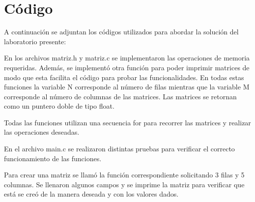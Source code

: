 \documentclass[
  letterpaper, 
  maincolor=black,
  sectioncolor=black!90,
  subsectioncolor=black!70,
  itemtextcolor=black!40,
]{fortysecondscv}
\begin{document}
\makefrontsidebar

\cvsubsection{\Huge }
\cvsubsection{\Huge }




\newpage

\section{Código}

A continuación se adjuntan los códigos utilizados para abordar la solución del laboratorio presente: 





En los archivos matriz.h y matriz.c se implementaron las operaciones de memoria requeridas. Además, se implementó otra función para poder imprimir matrices de modo que esta facilita el código para probar las funcionalidades. En todas estas funciones la variable N corresponde al número de filas mientras que la variable M corresponde al número de columnas de las matrices. Las matrices se retornan como un puntero doble de tipo float. 

Todas las funciones utilizan una secuencia for para recorrer las matrices y realizar las operaciones deseadas. 

En el archivo main.c se realizaron distintas pruebas para verificar el correcto funcionamiento de las funciones. 

Para crear una matriz se llamó la función correspondiente solicitando 3 filas y 5 columnas. Se llenaron algunos campos y se imprime la matriz para verificar que está se creó de la manera deseada y con los valores dados. 
\end{document}
